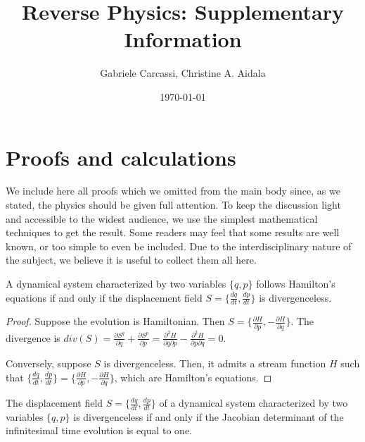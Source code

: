 \documentclass[10pt,twocolumn, nofootinbib]{revtex4-2}
\begin{document}
\title{Reverse Physics: Supplementary Information}
\author{Gabriele Carcassi, Christine A. Aidala}

\date{\today}


\maketitle


\section*{Proofs and calculations}

We include here all proofs which we omitted from the main body since, as we stated, the physics should be given full attention. To keep the discussion light and accessible to the widest audience, we use the simplest mathematical techniques to get the result. Some readers may feel that some results are well known, or too simple to even be included. Due to the interdisciplinary nature of the subject, we believe it is useful to collect them all here.

\begin{prop}
	A dynamical system characterized by two variables $\{q, p\}$ follows Hamilton's equations if and only if the displacement field $S=\{\frac{dq}{dt}, \frac{dp}{dt} \}$ is divergenceless.
\end{prop}

\begin{proof}
	Suppose the evolution is Hamiltonian. Then $S=\{\frac{\partial H}{\partial p}, - \frac{\partial H}{\partial q} \}$. The divergence is $div(S) = \frac{\partial S^q}{\partial q} + \frac{\partial S^p}{\partial p} = \frac{\partial^2 H}{\partial q\partial p} - \frac{\partial^2H}{\partial p\partial q} = 0$.
	
	Conversely, suppose $S$ is divergenceless. Then, it admits a stream function $H$ such that $\{\frac{dq}{dt}, \frac{dp}{dt}\} = \{\frac{\partial H}{\partial p}, - \frac{\partial H}{\partial q} \}$, which are Hamilton's equations.
\end{proof}

\begin{prop}
	The displacement field $S=\{\frac{dq}{dt}, \frac{dp}{dt} \}$ of a dynamical system characterized by two variables $\{q, p\}$ is divergenceless if and only if the Jacobian determinant of the infinitesimal time evolution is equal to one.
\end{prop}
\end{document}
